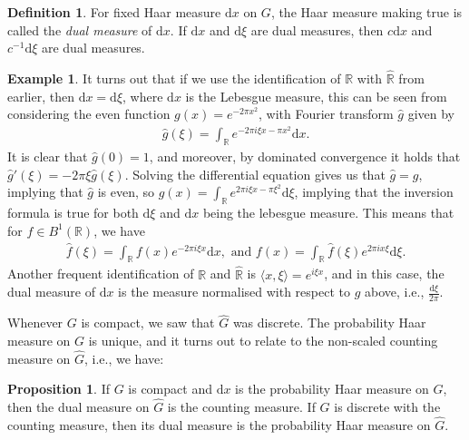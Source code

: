 \documentclass[10pt,twoside,openany,final]{memoir}
\theoremstyle{definition}
\newtheorem{proposition}[theorem]{Proposition}
\newtheorem{definition}[theorem]{Definition}
\theoremstyle{Break}
\newtheorem{example}[theorem]{Example}
\newcommand{\R}{\mathbb{R}}
\newcommand{\G}{\widehat{G}}
\renewcommand{\d}{\mathrm{d}}
\begin{document}
\begin{definition}
	For fixed Haar measure $\d x$ on $G$, the Haar measure making  true is called the \emph{dual measure} of $\d x$. If $\d x$ and $\d \xi$ are dual measures, then $c \d x$ and $c^{-1} \d \xi$ are dual measures.
\end{definition}
\begin{example}
	It turns out that if we use the identification of $\R$ with $\widehat{\R}$ from earlier, then $\d x = \d \xi$, where $\d x$ is the Lebesgue measure, this can be seen from considering the even function $g(x)=e^{-2\pi x^2}$, with Fourier transform $\hat{g}$ given by
\begin{align*}
	\widehat{g}(\xi) = \int_{\R} e^{-2\pi i \xi x - \pi x^{2}} \d x.
\end{align*}
It is clear that $\widehat{g}(0)=1$, and moreover, by dominated convergence it holds that $\hat{g}'(\xi)=-2 \pi \xi \hat{g}(\xi)$. Solving the differential equation gives us that $\hat{g}=g$, implying that $\hat{g}$ is even, so $g(x)=\int_{\R}e^{2 \pi i \xi x - \pi \xi^{2}} \d \xi$, implying that the inversion formula is true for both $\d \xi$ and $\d x$ being the lebesgue measure. This means that for $f \in B^1(\R)$, we have
\begin{align*}
	\widehat{f}(\xi) = \int_{\R}f(x) e^{-2 \pi  i \xi x} \d x, \text{  and  } f(x) =\int_{\R}\widehat{f}(\xi) e^{2\pi i x \xi} \d \xi.
\end{align*}
Another frequent identification of $\R$ and $\widehat{\R}$ is $\langle x , \xi \rangle = e^{i \xi x}$, and in this case, the dual measure of $\d x$ is the measure normalised with respect to $g$ above, i.e., $ \frac{\d \xi }{2 \pi}$.
\end{example}
Whenever $G$ is compact, we saw that $\G$ was discrete. The probability Haar measure on $G$ is unique, and it turns out to relate to the non-scaled counting measure on $\G$, i.e., we have:
\begin{proposition}
If $G$ is compact and $\d x$ is the probability Haar measure on $G$, then the dual measure on $\G$ is the counting measure. If $G$ is discrete with the counting measure, then its dual measure is the probability Haar measure on $\G$.	
\end{proposition}
\end{document}
